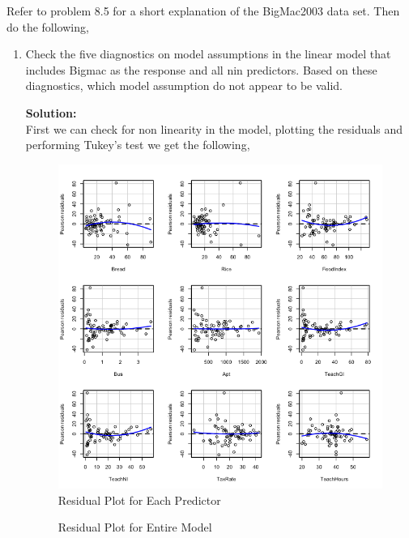 \documentclass[12pt]{article}
\makeatletter
\theoremstyle{homework}
\newenvironment{exercise}[1]
{\def\@currentlabel{#1}\exercisecore}
{\endexercisecore}
\newcommand{\localhead}[1]{\par\smallskip\noindent\textbf{#1}\nobreak\\}%
\newcommand\solution{\localhead{Solution:}}
\makeatother
\begin{document}
\begin{exercise}{1} Refer to problem 8.5 for a short explanation of the BigMac2003 data set. Then do the following, 
  \begin{enumerate}
    \item Check the five diagnostics on model assumptions in the linear model that includes Bigmac as the response and 
    all nin predictors. Based on these diagnostics, which model assumption do not appear to be valid. \\
    \solution First we can check for non linearity in the model, plotting the residuals and performing Tukey's test we get the following, 
\begin{figure}[H]
  \begin{center}
  \caption{Residual Plot for Each Predictor}
  \includegraphics[width = \textwidth]{Rplot.png}
  \end{center}
\end{figure}
\begin{figure}[H]
  \begin{center}
  \caption{Residual Plot for Entire Model}

\end{center}
\end{figure}
\end{enumerate}
\end{exercise}
\end{document}
